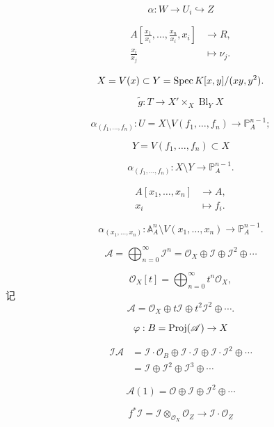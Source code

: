 
\[
	\alpha:W\to U_i\hookrightarrow Z
\]

\[
	\begin{aligned}
		A\left[\frac{x_1}{x_i},\dots,\frac{x_n}{x_i},x_i\right] & \longrightarrow R,\\
		\frac{x_i}{x_j}&\longmapsto \nu_j.
	\end{aligned}
\]

\[
	X=V(x)\subset Y=\operatorname{Spec} K[x,y]/(xy,y^2).
\]



\[
	\tilde g:T\to X'\times_X \operatorname{Bl}_Y X
\]

\[
	\alpha_{(f_1,\dots,f_n)}:U=X\setminus V(f_1,\dots,f_n)\longrightarrow \mathbb P_A^{n-1};
\]

\[
	Y=V(f_1,\dots,f_n)\subset X
\]

\[
	\alpha_{(f_1,\dots,f_n)}:X\setminus Y\longrightarrow \mathbb P_A^{n-1}.
\]

\[
	\begin{aligned}
		A\left[x_1,\dots,x_n\right] & \longrightarrow A,\\
		x_i &\longmapsto f_i.
	\end{aligned}
\]

\[
	\alpha_{(x_1,\dots,x_n)}:\mathbb A_A^n\setminus V(x_1,\dots,x_n)\longrightarrow \mathbb P_A^{n-1}.
\]


\[
	\mathscr A=\bigoplus_{n=0}^\infty \mathscr I^n=\mathscr O_X\oplus \mathscr I\oplus \mathscr I^2\oplus \cdots
\]

\[
	\mathscr O_X[t]=\bigoplus_{n=0}^\infty t^n\mathscr O_X,
\]
记
\[
	\mathscr A=\mathscr O_X\oplus t\mathscr I\oplus t^2\mathscr I^2\oplus \cdots.
\]

\[
	\varphi:B=\operatorname{Proj}(\mathscr A)\to X
\]

\[
	\begin{aligned}
	\mathscr I\mathscr A&=\mathscr I\cdot \mathscr O_B\oplus \mathscr I\cdot \mathscr I\oplus \mathscr I\cdot \mathscr I^2 \oplus \cdots\\
	&=\mathscr I\oplus \mathscr I^2 \oplus \mathscr I^3\oplus \cdots
	\end{aligned}
\]

\[
	\mathscr A(1)=\mathscr O\oplus \mathscr I \oplus \mathscr I^2\oplus \cdots
\]


\[
	f^*\mathscr I=\mathscr I\otimes_{\mathscr O_X}\mathscr O_Z\to \mathscr I\cdot \mathscr O_Z
\]

